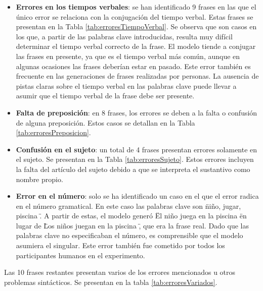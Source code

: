 \documentclass[11pt,spanish,listoffigures,listoftables]{tfgetsinf}
\begin{document}
\begin{itemize}
	\item \textbf{Errores en los tiempos verbales}: se han identificado 9 frases en las que el único error se relaciona con la conjugación del tiempo verbal. Estas frases se presentan en la Tabla \ref{tab:erroresTiempoVerbal}. Se observa que son casos en los que, a partir de las palabras clave introducidas, resulta muy difícil determinar el tiempo verbal correcto de la frase. El modelo tiende a conjugar las frases en presente, ya que es el tiempo verbal más común, aunque en algunas ocasiones las frases deberían estar en pasado. Este error también es frecuente en las generaciones de frases realizadas por personas. La ausencia de pistas claras sobre el tiempo verbal en las palabras clave puede llevar a asumir que el tiempo verbal de la frase debe ser presente.
	\item \textbf{Falta de preposición}: en 8 frases, los errores se deben a la falta o confusión de alguna preposición. Estos casos se detallan en la Tabla \ref{tab:erroresPreposicion}.
	\item \textbf{Confusión en el sujeto}: un total de 4 frases presentan errores solamente en el sujeto. Se presentan en la Tabla \ref{tab:erroresSujeto}. Estos errores incluyen la falta del artículo del sujeto debido a que se interpreta el sustantivo como nombre propio.
	\item \textbf{Error en el número}: solo se ha identificado un caso en el que el error radica en el número gramatical. En este caso las palabras clave son \" niño, jugar, piscina \". A partir de estas, el modelo generó \" El niño juega en la piscina \" en lugar de  \" Los niños juegan en la piscina \", que era la frase real. Dado que las palabras clave no especificaban el número, es comprensible que el modelo asumiera el singular. Este error también fue cometido por todos los participantes humanos en el experimento.
\end{itemize}

Las 10 frases restantes presentan varios de los errores mencionados u otros problemas sintácticos. Se presentan en la tabla \ref{tab:erroresVariados}.
\end{document}
